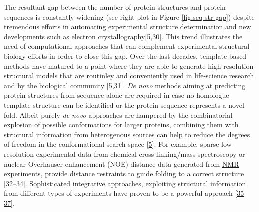 \documentclass[11pt,a4paper,twoside]{book}
\theoremstyle{definition}
\theoremstyle{definition}
\theoremstyle{remark}
\begin{document}
The resultant gap between the number of protein structures and protein
sequences is constantly widening (see right plot in Figure
\ref{fig:seq-str-gap}) despite tremendous efforts in automating
experimental structure determination and new developments such as
electron
crystallography{[}\protect\hyperlink{ref-Schwede2013}{5},\protect\hyperlink{ref-Clabbers2017}{30}{]}.
This trend illustrates the need of computational approaches that can
complement experimental structural biology efforts in order to close
this gap. Over the last decades, template-based methods have matured to
a point where they are able to generate high-resolution structural
models that are routinley and conveniently used in life-science research
and by the biological community
{[}\protect\hyperlink{ref-Schwede2013}{5},\protect\hyperlink{ref-BKC2016}{31}{]}.
\emph{De novo} methods aiming at predicting protein structures from
sequence alone are required in case no homologue template structure can
be identified or the protein sequence represents a novel fold. Albeit
purely \emph{de novo} approaches are hampered by the combinatorial
explosion of possible conformations for larger proteins, combining them
with structural information from heterogenous sources can help to reduce
the degrees of freedom in the conformational search space
{[}\protect\hyperlink{ref-Schwede2013}{5}{]}. For example, sparse
low-resolution experimental data from chemical cross-linking/mass
spectroscopy or nuclear Overhauser enhancement (NOE) distance data
generated from \protect\hyperlink{abbrev}{NMR} experiments, provide
distance restraints to guide folding to a correct structure
{[}\protect\hyperlink{ref-Li2004}{32}--\protect\hyperlink{ref-Rappsilber2011}{34}{]}.
Sophisticated integrative approaches, exploiting structural information
from different types of experiments have proven to be a powerful
approach
{[}\protect\hyperlink{ref-Ornes2016}{35}--\protect\hyperlink{ref-Tang2015}{37}{]}.
\end{document}
